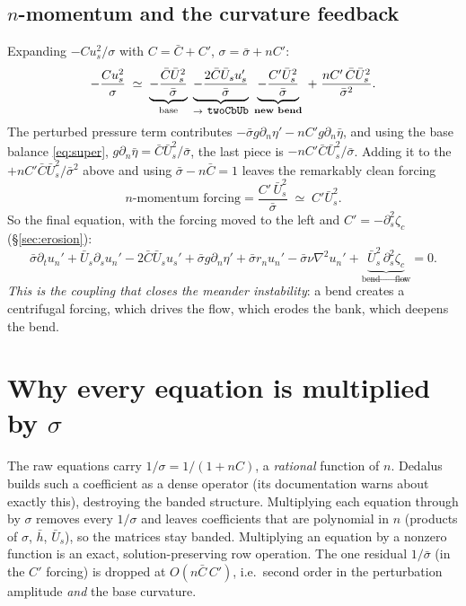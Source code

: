 \documentclass[11pt]{article}
\newcommand{\us}{u_s}
\newcommand{\un}{u_n}
\newcommand{\Us}{\bar U_s}
\newcommand{\ds}{\partial_s}
\newcommand{\dn}{\partial_n}
\newcommand{\dt}{\partial_t}
\newcommand{\code}[1]{\texttt{\small #1}}
\begin{document}
\subsection{$n$-momentum and the curvature feedback}
\label{sec:feedback}
Expanding $-C\us^{2}/\sigma$ with $C=\bar C+C'$, $\sigma=\bar\sigma+nC'$:
\begin{equation}
  -\frac{C\us^{2}}{\sigma}\;\simeq\;
  \underbrace{-\frac{\bar C\Us^{2}}{\bar\sigma}}_{\text{base}}
  \;\underbrace{-\frac{2\bar C\Us\us'}{\bar\sigma}}_{\to\ \code{twoCbUb}}
  \;\underbrace{-\frac{C'\Us^{2}}{\bar\sigma}}_{\text{\bf new bend}}
  \;+\;\frac{nC'\,\bar C\Us^{2}}{\bar\sigma^{2}} .
\end{equation}
The perturbed pressure term contributes $-\bar\sigma g\dn\eta'-nC'g\dn\bar\eta$, and
using the base balance \eqref{eq:super}, $g\dn\bar\eta=\bar C\Us^2/\bar\sigma$, the
last piece is $-nC'\bar C\Us^{2}/\bar\sigma$. Adding it to the $+nC'\bar C\Us^2/\bar\sigma^2$
above and using $\bar\sigma-n\bar C=1$ leaves the remarkably clean forcing
\begin{equation}
  \boxed{\;\text{$n$-momentum forcing}=\frac{C'\,\Us^{2}}{\bar\sigma}\;\simeq\;C'\Us^{2}.\;}
\end{equation}
So the final equation, with the forcing moved to the left and
$C'=-\partial_s^{2}\zeta_c$ (\S\ref{sec:erosion}):
\begin{equation}
  \bar\sigma\dt\un'+\Us\ds\un'-2\bar C\Us\us'+\bar\sigma g\dn\eta'
  +\bar\sigma r_n\un'-\bar\sigma\nu\nabla^{2}\un'
  +\underbrace{\Us^{2}\,\partial_s^{2}\zeta_c}_{\text{bend $\to$ flow}}=0 .
  \tag{$\to$ eq.\ 3}
\end{equation}
\emph{This is the coupling that closes the meander instability}: a bend creates a
centrifugal forcing, which drives the flow, which erodes the bank, which deepens
the bend.

\section{Why every equation is multiplied by $\sigma$}
\label{sec:sigma}

The raw equations carry $1/\sigma=1/(1+nC)$, a \emph{rational} function of $n$.
Dedalus builds such a coefficient as a dense operator (its documentation warns
about exactly this), destroying the banded structure. Multiplying each equation
through by $\sigma$ removes every $1/\sigma$ and leaves coefficients that are
polynomial in $n$ (products of $\sigma$, $\bar h$, $\Us$), so the matrices stay
banded. Multiplying an equation by a nonzero function is an exact,
solution-preserving row operation.
The one residual $1/\bar\sigma$ (in the $C'$ forcing) is dropped at
$O(n\bar C\,C')$, i.e.\ second order in the perturbation amplitude \emph{and} the
base curvature.
\end{document}
